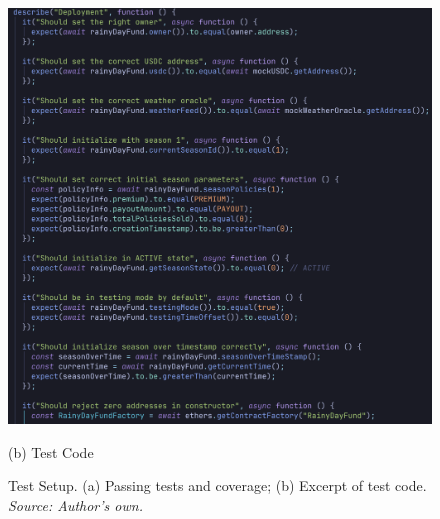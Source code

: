 \documentclass[11pt,a4paper]{article}
\begin{document}
\begin{figure}[H]
\begin{minipage}[b]{0.48\textwidth}
            \includegraphics[width=0.95\linewidth]{graphics/Test_Code}
            \caption*{(b) Test Code}
        \end{minipage}
        \caption{Test Setup. (a) Passing tests and coverage; (b) Excerpt of test code. \\ \textit{Source: Author's own.}}
        \label{fig:test-set-up}
    \end{figure}


\end{document}

